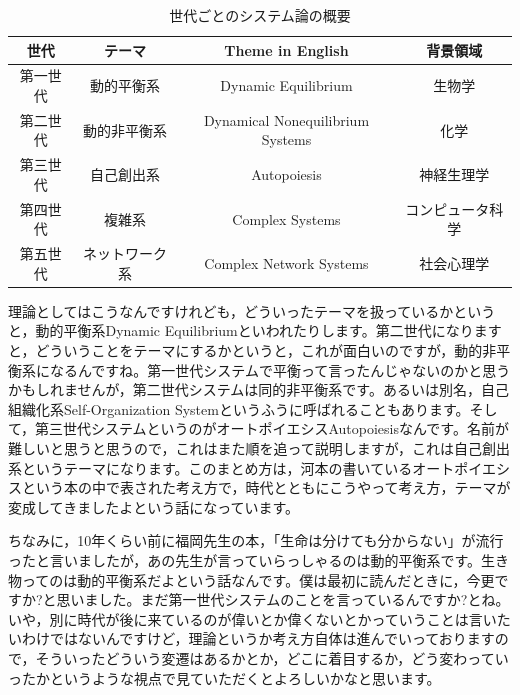 \documentclass{ltjsbook}
\begin{document}
\begin{table}[h!]
    \centering
    \caption{世代ごとのシステム論の概要}
    \begin{tabular}{cccc}
    \hline
    世代 & テーマ & Theme in English & 背景領域  \\ \hline
    第一世代 & 動的平衡系 & Dynamic Equilibrium & 生物学  \\ 
    第二世代 & 動的非平衡系 & Dynamical Nonequilibrium Systems & 化学  \\ 
    第三世代 & 自己創出系 & Autopoiesis & 神経生理学 \\ 
    第四世代 & 複雑系 & Complex Systems & コンピュータ科学  \\ 
    第五世代 & ネットワーク系 & Complex Network Systems & 社会心理学 \\ \hline
    \end{tabular}
    \label{tab:system_generations}
\end{table}


理論としてはこうなんですけれども，どういったテーマを扱っているかというと，動的平衡系Dynamic Equilibriumといわれたりします。第二世代になりますと，どういうことをテーマにするかというと，これが面白いのですが，動的非平衡系になるんですね。第一世代システムで平衡って言ったんじゃないのかと思うかもしれませんが，第二世代システムは同的非平衡系です。あるいは別名，自己組織化系Self-Organization Systemというふうに呼ばれることもあります。そして，第三世代システムというのがオートポイエシスAutopoiesisなんです。名前が難しいと思うと思うので，これはまた順を追って説明しますが，これは自己創出系というテーマになります。このまとめ方は，河本の書いているオートポイエシスという本\parencite{KawamotoHideo}の中で表された考え方で，時代とともにこうやって考え方，テーマが変成してきましたよという話になっています。

ちなみに，10年くらい前に福岡先生の本，「生命は分けても分からない」\parencite{FukuokaShin1}が流行ったと言いましたが，あの先生が言っていらっしゃるのは動的平衡系です。生き物ってのは動的平衡系だよという話なんです。僕は最初に読んだときに，今更ですか?と思いました。まだ第一世代システムのことを言っているんですか?とね。いや，別に時代が後に来ているのが偉いとか偉くないとかっていうことは言いたいわけではないんですけど，理論というか考え方自体は進んでいっておりますので，そういったどういう変遷はあるかとか，どこに着目するか，どう変わっていったかというような視点で見ていただくとよろしいかなと思います。
\end{document}
